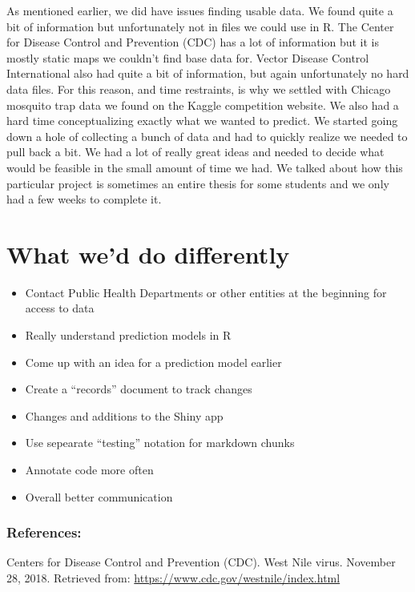 \documentclass[]{article}
\providecommand{\tightlist}{%
  \setlength{\itemsep}{0pt}\setlength{\parskip}{0pt}}
\begin{document}
As mentioned earlier, we did have issues finding usable data. We found
quite a bit of information but unfortunately not in files we could use
in R. The Center for Disease Control and Prevention (CDC) has a lot of
information but it is mostly static maps we couldn't find base data for.
Vector Disease Control International also had quite a bit of
information, but again unfortunately no hard data files. For this
reason, and time restraints, is why we settled with Chicago mosquito
trap data we found on the Kaggle competition website. We also had a hard
time conceptualizing exactly what we wanted to predict. We started going
down a hole of collecting a bunch of data and had to quickly realize we
needed to pull back a bit. We had a lot of really great ideas and needed
to decide what would be feasible in the small amount of time we had. We
talked about how this particular project is sometimes an entire thesis
for some students and we only had a few weeks to complete it.

\hypertarget{what-wed-do-differently}{%
\section{What we'd do differently}\label{what-wed-do-differently}}

\begin{itemize}
\tightlist
\item
  Contact Public Health Departments or other entities at the beginning
  for access to data
\item
  Really understand prediction models in R
\item
  Come up with an idea for a prediction model earlier
\item
  Create a ``records'' document to track changes
\item
  Changes and additions to the Shiny app
\item
  Use sepearate ``testing'' notation for markdown chunks
\item
  Annotate code more often
\item
  Overall better communication
\end{itemize}

\hypertarget{references}{%
\subsubsection{References:}\label{references}}

Centers for Disease Control and Prevention (CDC). West Nile virus.
November 28, 2018. Retrieved from:
\url{https://www.cdc.gov/westnile/index.html}
\end{document}
